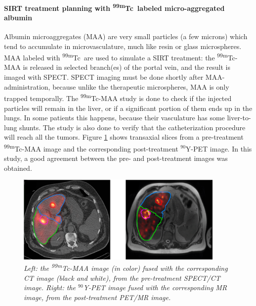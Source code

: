 \documentclass[11pt,oneside]{article}
\begin{document}
\paragraph{SIRT treatment planning with \textsuperscript{99m}Tc\ labeled
  micro-aggregated albumin}
Albumin microaggregates (MAA) are very small particles (a few microns)
which tend to accumulate in microvasculature, much like resin or glass
microspheres. MAA labeled with \textsuperscript{99m}Tc\ are used to simulate a SIRT
treatment: the \textsuperscript{99m}Tc-MAA is released in selected branch(es) of
the portal vein, and the result is imaged with SPECT. SPECT imaging
must be done shortly after MAA-administration, because unlike the
therapeutic microspheres, MAA is only trapped temporally. The
\textsuperscript{99m}Tc-MAA study is done to check if the injected particles will
remain in the liver, or if a significant portion of them ends up in
the lungs. In some patients this happens, because their vasculature
has some liver-to-lung shunts. The study is also done to verify that
the catheterization procedure will reach all the tumors.  Figure
\ref{fig:SirtMaaY} shows transaxial slices from a pre-treatment
\textsuperscript{99m}Tc-MAA image and the corresponding post-treatment $^{90}$Y-PET
image. In this study, a good agreement between the pre- and
post-treatment images was obtained. 
%
\begin{figure}[h]
\centering
\includegraphics[width=0.9\textwidth]{figs/fig_SIRT_Tc_Y.png}
\caption{\label{fig:SirtMaaY} \emph{Left: the \textsuperscript{99m}Tc-MAA
    image (in color) fused with the corresponding CT image (black and
    white), from the pre-treatment SPECT/CT image. Right: the
    $^{90}$Y-PET image fused with the corresponding MR
    image, from the post-treatment PET/MR image.}}
\end{figure}
%
\end{document}
